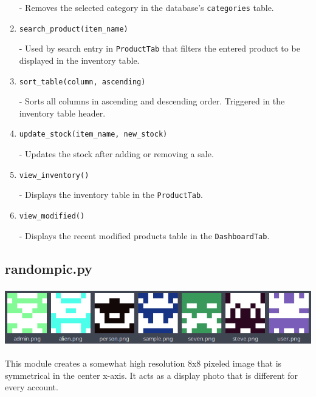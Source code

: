 \documentclass[12pt,a4paper]{article}
\begin{document}
\begin{enumerate}
                - Removes the selected category in the database's
                \texttt{categories} table.

            \item[\ding{118}]\texttt{search\_product(item\_name)}

                - Used by search entry in \texttt{ProductTab} that filters the entered 
                product to be displayed in the inventory table.

            \item[\ding{118}]\texttt{sort\_table(column, ascending)}

                - Sorts all columns in ascending and descending order. Triggered in 
                the inventory table header.

            \item[\ding{118}]\texttt{update\_stock(item\_name, new\_stock)}

                - Updates the stock after adding or removing a sale.

            \item[\ding{118}]\texttt{view\_inventory()}

                - Displays the inventory table in the \texttt{ProductTab}.

            \item[\ding{118}]\texttt{view\_modified()}

                - Displays the recent modified products table in the 
                \texttt{DashboardTab}.
        \end{enumerate}


        \subsection*{\normalfont{\faCode{}} \textbf{randompic.py}}

            \includegraphics[width=\textwidth,height=1in]{randompics.png}

            This module creates a somewhat high resolution 8x8 pixeled image that is 
            symmetrical in the center x-axis. It acts as a display photo that is 
            different for every account.
\end{document}
